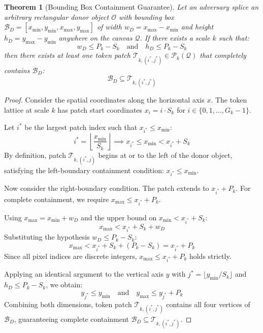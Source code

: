\documentclass[journal]{IEEEtran}
\newtheorem{theorem}{Theorem}
\begin{document}
\begin{theorem}[Bounding Box Containment Guarantee]
Let an adversary splice an arbitrary rectangular donor object $\mathcal{O}$ with bounding box $\mathcal{B}_D = [x_{\min}, y_{\min}, x_{\max}, y_{\max}]$ of width $w_D = x_{\max} - x_{\min}$ and height $h_D = y_{\max} - y_{\min}$ anywhere on the canvas $\mathcal{Q}$. If there exists a scale $k$ such that:
\begin{equation}
w_D \le P_k - S_k \quad \text{and} \quad h_D \le P_k - S_k
\label{eq:containment_condition}
\end{equation}
then there exists at least one token patch $\mathcal{T}_{k, (i^*, j^*)} \in \mathcal{P}_k(\mathcal{Q})$ that completely contains $\mathcal{B}_D$:
\begin{equation}
\mathcal{B}_D \subseteq \mathcal{T}_{k, (i^*, j^*)}
\end{equation}
\end{theorem}

\begin{proof}
Consider the spatial coordinates along the horizontal axis $x$. The token lattice at scale $k$ has patch start coordinates $x_i = i \cdot S_k$ for $i \in \{0, 1, \dots, G_k - 1\}$. 

Let $i^*$ be the largest patch index such that $x_{i^*} \le x_{\min}$:
\begin{equation}
i^* = \left\lfloor \frac{x_{\min}}{S_k} \right\rfloor \implies x_{i^*} \le x_{\min} < x_{i^*} + S_k
\end{equation}
By definition, patch $\mathcal{T}_{k, (i^*, j)}$ begins at or to the left of the donor object, satisfying the left-boundary containment condition: $x_{i^*} \le x_{\min}$.

Now consider the right-boundary condition. The patch extends to $x_{i^*} + P_k$. For complete containment, we require $x_{\max} \le x_{i^*} + P_k$. 

Using $x_{\max} = x_{\min} + w_D$ and the upper bound on $x_{\min} < x_{i^*} + S_k$:
\begin{equation}
x_{\max} < x_{i^*} + S_k + w_D
\end{equation}
Substituting the hypothesis $w_D \le P_k - S_k$:
\begin{equation}
x_{\max} < x_{i^*} + S_k + (P_k - S_k) = x_{i^*} + P_k
\end{equation}
Since all pixel indices are discrete integers, $x_{\max} \le x_{i^*} + P_k$ holds strictly.

Applying an identical argument to the vertical axis $y$ with $j^* = \lfloor y_{\min} / S_k \rfloor$ and $h_D \le P_k - S_k$, we obtain:
\begin{equation}
y_{j^*} \le y_{\min} \quad \text{and} \quad y_{\max} \le y_{j^*} + P_k
\end{equation}
Combining both dimensions, token patch $\mathcal{T}_{k, (i^*, j^*)}$ contains all four vertices of $\mathcal{B}_D$, guaranteeing complete containment $\mathcal{B}_D \subseteq \mathcal{T}_{k, (i^*, j^*)}$.
\end{proof}
\end{document}
